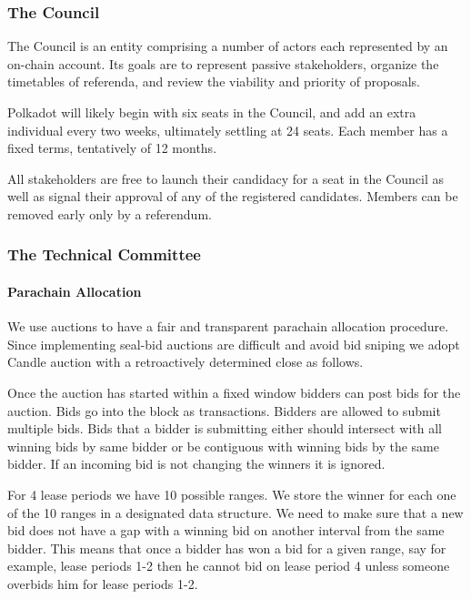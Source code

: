 \subsubsection{The Council}\label{s:council}

The Council is an entity comprising a number of actors each represented by an on-chain account. Its goals are to represent passive stakeholders, organize the timetables of referenda, and review the viability and priority of proposals.

Polkadot will likely begin with six seats in the Council, and add an extra individual every two weeks, ultimately settling at 24 seats. Each member has a fixed terms, tentatively of 12 months. 

 All stakeholders are free to launch their candidacy for a seat in the Council as well as signal their approval of any of the registered candidates. Members can be removed early only by a referendum.

\subsubsection{The Technical Committee}\label{s:technical}
 
 \paragraph{Parachain Allocation\eray{}{:}}
We use auctions to have a fair and transparent parachain allocation procedure.
Since implementing seal-bid auctions are difficult and  avoid bid sniping\eray{}{,} we adopt  Candle auction \cite{Fuellbrunn:2012:CandleAuction} with a retroactively determined close as follows.

Once the auction has started within a fixed window\eray{}{,} bidders can post bids for the auction.
Bids go into the block as transactions.
Bidders are allowed to submit multiple bids.
Bids that a bidder is submitting either should intersect with all winning bids by same bidder or be contiguous with winning bids by the same bidder.
If an incoming bid is not changing the winners\eray{}{,} it is ignored.

For 4 lease periods\eray{}{,} we have 10 possible ranges.
We store the winner for each one of the 10 ranges in a designated data structure.
We need to make sure that a new bid does not have a gap with a winning bid on another interval from the same bidder.
This means that once a bidder has won a bid for a given range, say for example, lease periods 1-2\eray{}{,}  then he cannot bid on lease period 4 unless someone overbids him for lease periods 1-2.

